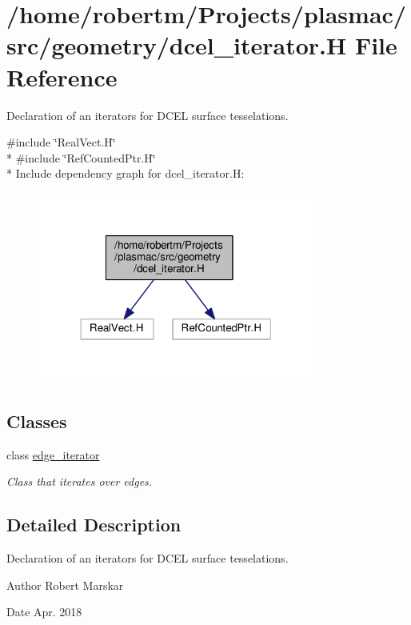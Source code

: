\hypertarget{dcel__iterator_8H}{}\section{/home/robertm/\+Projects/plasmac/src/geometry/dcel\+\_\+iterator.H File Reference}
\label{dcel__iterator_8H}


Declaration of an iterators for D\+C\+EL surface tesselations.  


{\ttfamily \#include \char`\"{}Real\+Vect.\+H\char`\"{}}\\*
{\ttfamily \#include \char`\"{}Ref\+Counted\+Ptr.\+H\char`\"{}}\\*
Include dependency graph for dcel\+\_\+iterator.\+H\+:\nopagebreak
\begin{figure}[H]
\begin{center}
\leavevmode
\includegraphics[width=258pt]{dcel__iterator_8H__incl}
\end{center}
\end{figure}
\subsection*{Classes}
\begin{DoxyCompactItemize}
\item 
class \hyperlink{classedge__iterator}{edge\+\_\+iterator}
\begin{DoxyCompactList}\small\item\em Class that iterates over edges. \end{DoxyCompactList}\end{DoxyCompactItemize}


\subsection{Detailed Description}
Declaration of an iterators for D\+C\+EL surface tesselations. 

\begin{DoxyAuthor}{Author}
Robert Marskar 
\end{DoxyAuthor}
\begin{DoxyDate}{Date}
Apr. 2018 
\end{DoxyDate}
